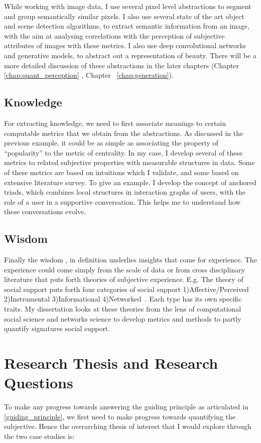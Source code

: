 While working with image data, I use several pixel level abstractions to segment and group semantically similar pixels. I also use several state of the art object and scene detection algorithms, to extract semantic information from an image, with the aim at analysing correlations with the perception of subjective attributes of images with these metrics. I also use deep convolutional networks and generative models, to abstract out a representation of beauty. There will be a more detailed discussion of these abstractions in the later chapters (Chapter \ref{chap:quant_perception} , Chapter ~\ref{chap:generation}).  

\subsection{Knowledge}
For extracting knowledge, we need to first associate meanings to certain computable metrics that we obtain from the abstractions. As discussed in the previous example, it could be as simple as associating the property of ``popularity'' to the metric of centrality. In my case, I develop several of these metrics to related subjective properties with measurable structures in data. Some of these metrics are based on intuitions which I validate, and some based on extensive literature survey. To give an example, I develop the concept of anchored triads, which combines local structures in interaction graphs of users, with the role of a user in a supportive conversation. This helps me to understand how these conversations evolve.

\subsection{Wisdom}
Finally the wisdom , in definition underlies insights that come for experience. The experience could come simply from the scale of data or from cross disciplinary literature that puts forth theories of subjective experience. E.g. The theory of social support puts forth four categories of social support 1)Affective/Perceived 2)Instrumental 3)Informational 4)Networked~\cite{cutrona1992controllability}. Each type has its own specific traits. My dissertation looks at these theories from the lens of computational social science and networks science to develop metrics and methods to partly quantify signatures social support.

\section{Research Thesis and Research Questions}
To make any progress towards answering the guiding principle as articulated in \ref{guiding_principle}, we first need to make progress towards quantifying the subjective.
Hence the overarching thesis of interest that I would explore through the two case studies is:

